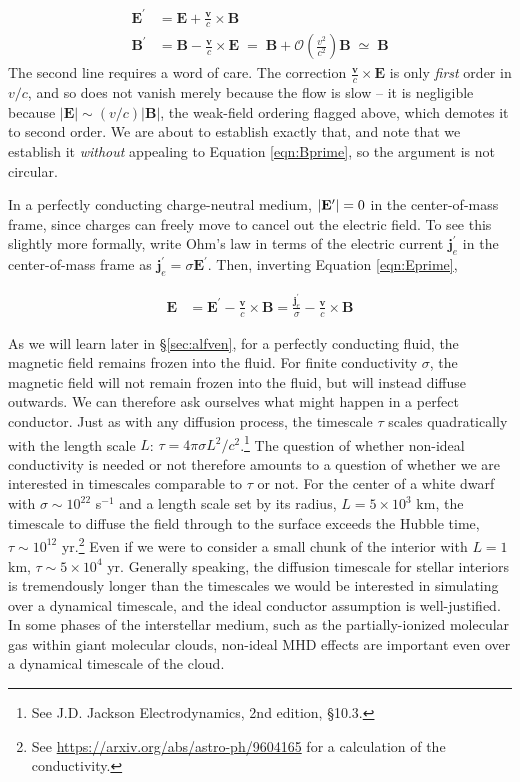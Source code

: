\documentclass[notoc]{tufte-handout}
\renewcommand{\vec}[1]{\mathbf{#1}}
\newcommand{\E}{\vec{E}}
\newcommand{\B}{\vec{B}}
\begin{document}
\begin{align}
    \E^\prime & = \E + \frac{\vec{v}}{c} \times \B  \label{eqn:Eprime} \\
    \B^\prime & = \B - \frac{\vec{v}}{c} \times \E \; = \; \B + \mathcal{O}\left(\frac{v^2}{c^2}\right) \B \; \simeq \; \B \label{eqn:Bprime}
\end{align}
%
The second line requires a word of care. The correction $\frac{\vec{v}}{c} \times \E$ is only {\it first} order in $v/c$, and so does not vanish merely because the flow is slow -- it is negligible because $|\E| \sim (v/c)|\B|$, the weak-field ordering flagged above, which demotes it to second order. We are about to establish exactly that, and note that we establish it {\it without} appealing to Equation \ref{eqn:Bprime}, so the argument is not circular.

In a perfectly conducting charge-neutral medium, $\abs{\E^\prime}=0$ in the center-of-mass frame, since charges can freely move to cancel out the electric field.  To see this slightly more formally, write Ohm's law in terms of the electric current $\vec {j}_e^\prime$ in the center-of-mass frame as $\vec {j}^\prime_e = \sigma \vec {E}^\prime$. Then, inverting Equation \ref{eqn:Eprime},

\begin{align}
\E & = \E^\prime - \frac{\vec{v} }{c}\times \B = \frac{\vec{j}_e^\prime}{\sigma} - \frac{\vec{v}}{c}\times \B
\end{align}

As we will learn later in \S \ref {sec:alfven},  for a perfectly conducting fluid, the magnetic field remains frozen into the fluid. For finite conductivity $\sigma$, the magnetic field will not remain frozen into the fluid, but will instead diffuse outwards. We can therefore ask ourselves what might happen in a perfect conductor. Just as with any diffusion process, the timescale $\tau$ scales quadratically with the length scale $L$: $\tau = 4 \pi \sigma L^2 / c^2$.\footnote {See J.D. Jackson Electrodynamics, 2nd edition, \S 10.3.} The question of whether non-ideal conductivity is needed or not therefore amounts to a question of whether we are interested in timescales comparable to $\tau$ or not. %
For the center of a white dwarf with $\sigma \sim 10^{22}$ s$^{-1}$ and a length scale set by its radius, $L = 5 \times 10^3$ km, the timescale to diffuse the field through to the surface exceeds the Hubble time, $\tau \sim 10^{12}$ yr.\footnote {See \url{https://arxiv.org/abs/astro-ph/9604165} for a calculation of the conductivity.} Even if we were to consider a small chunk of the interior with $L = 1 $ km, $\tau \sim 5 \times 10^4$ yr. Generally speaking, the diffusion timescale for stellar interiors is tremendously longer than the timescales we would be interested in simulating over a dynamical timescale, and the ideal conductor assumption is well-justified. In some phases of the interstellar medium, such as  the partially-ionized molecular gas within giant molecular clouds, non-ideal MHD effects are important even over a dynamical timescale of the cloud.
\end{document}

